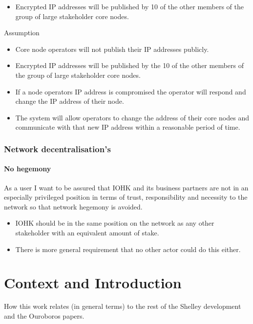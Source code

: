 \documentclass{report}
\theoremstyle{definition}{
  \newtheorem{lemma}{Lemma}[section] %
  \newtheorem{definition}[lemma]{Definition}
}
\theoremstyle{theorem}{
  \newtheorem{invariant}[lemma]{Invariant}
  \newtheorem{proofobligation}[lemma]{Proof Obligation}
}
\numberwithin{equation}{lemma}
\begin{document}
\begin{itemize}
\item Encrypted IP addresses will be published by 10 of the other members of
      the group of large stakeholder core nodes.
\end{itemize}

Assumption

\begin{itemize}
\item Core node operators will not publish their IP addresses publicly.
\item Encrypted IP addresses will be published by the 10 of the other members
      of the group of large stakeholder core nodes.
\item If a node operators IP address is compromised the operator will respond
      and change the IP address of their node.
\item The system will allow operators to change the address of their core nodes
      and communicate with that new IP address within a reasonable period of
      time.
\end{itemize}


\subsubsection{Network decentralisation's}

\paragraph{No hegemony}

As a user I want to be assured that IOHK and its business partners are not in
an especially privileged position in terms of trust, responsibility and
necessity to the network so that network hegemony is avoided.

\begin{itemize}
\item IOHK should be in the same position on the network as any other
      stakeholder with an equivalent amount of stake.
\item There is more general requirement that no other actor could do this
      either.
\end{itemize}

\section{Context and Introduction}

How this work relates (in general terms) to the rest of the Shelley
development and the Ouroboros papers.
\end{document}
